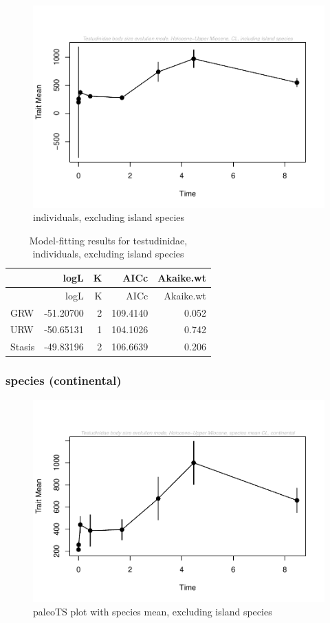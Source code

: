 \documentclass[]{article}
\begin{document}
\begin{figure}[htbp]
\centering
\includegraphics{MA_JJ_files/figure-latex/paleoTS, individuals, exluding island species-1.pdf}
\caption{individuals, excluding island species}
\end{figure}

\begin{longtable}[]{@{}lrrrr@{}}
\caption{Model-fitting results for testudinidae, individuals, excluding
island species}\tabularnewline
\toprule
& logL & K & AICc & Akaike.wt\tabularnewline
\midrule
\endfirsthead
\toprule
& logL & K & AICc & Akaike.wt\tabularnewline
\midrule
\endhead
GRW & -51.20700 & 2 & 109.4140 & 0.052\tabularnewline
URW & -50.65131 & 1 & 104.1026 & 0.742\tabularnewline
Stasis & -49.83196 & 2 & 106.6639 & 0.206\tabularnewline
\bottomrule
\end{longtable}

\newpage

\subsubsection{species (continental)}\label{species-continental}

\begin{figure}[htbp]
\centering
\includegraphics{MA_JJ_files/figure-latex/paleoTS plot with species mean, excluding island species-1.pdf}
\caption{paleoTS plot with species mean, excluding island species}
\end{figure}
\end{document}
